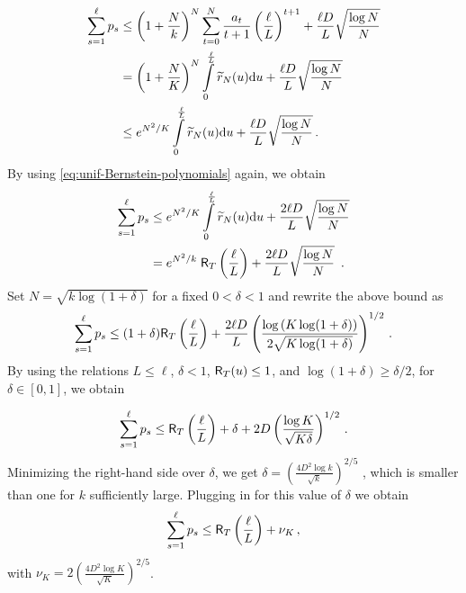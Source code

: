 \documentclass[11pt]{article}
\begin{document}
\begin{align*}
	\sum\limits_{s=1}^{\ell}p_s &\leq\left(1+\frac{N}{k}\right)^N \sum\limits_{t=0}^{N} \frac{a_t}{t+1}\left(\frac{\ell}{L}\right)^{t+1}+ \frac{\ell D}{L}\sqrt{\frac{\log{N}}{N}}\\
	&=\left(1+\frac{N}{K}\right)^N\int\limits_{0}^{\frac{\ell}{L}}\widetilde{r}_N(u){\rm d} u+ \frac{\ell D}{L}\sqrt{\frac{\log{N}}{N}}\\
	&\leq e^{N^2/K}\int\limits_{0}^{\frac{\ell}{L}}\widetilde{r}_N(u){\rm d} u+ \frac{\ell D}{L}\sqrt{\frac{\log{N}}{N}}\,.
	\end{align*}
By using \eqref{eq:unif-Bernstein-polynomials} again, we obtain 
%
\begin{align*}
	\sum\limits_{s=1}^{\ell}p_s&\leq e^{N^2/K}\int\limits_{0}^{\frac{\ell}{L}}\widetilde{r}_N(u){\rm d} u+ \frac{2\ell D}{L}\sqrt{\frac{\log{N}}{N}}\\
	&=e^{N^2/k}\;\mathsf{R}_{T}\left(\frac{\ell}{L} \right)+ \frac{2\ell D}{L}\sqrt{\frac{\log{N}}{N}}\ \,.
\end{align*}
Set $N=\sqrt{k\log(1+\delta) }$ for a fixed $0<\delta<1$ and rewrite the above bound as
\[	\sum\limits_{s=1}^{\ell}p_s \leq
(1+\delta)\mathsf{R}_{T}\left(\frac{\ell}{L} \right)+ \frac{2\ell D}{L}\left( \frac{\log\left(K\log(1+\delta)\right)}{2\sqrt{K\log(1+\delta)}}\right)^{1/2}\,.
\]
By using the relations  $L\leq\ell$, $\delta<1$, $\mathsf{R}_T(u)\leq 1$, and $\log(1+\delta)\geq\delta/2$, for $\delta\in[0,1]$, we obtain

\[	\sum\limits_{s=1}^{\ell}p_s \leq
\mathsf{R}_{T}\left(\frac{\ell}{L} \right)+ \delta +2D\left( \frac{\log{K}}{\sqrt{K\delta}}\right)^{1/2}\,.
\]
Minimizing the right-hand side over $\delta$, we get $\delta = \left(\frac{4D^2\log{k}}{\sqrt{k}}  \right)^{2/5}$ , which is smaller than one for $k$ sufficiently large. Plugging in for this value of $\delta$ we obtain 
\[
\sum\limits_{s=1}^{\ell}p_s \leq \mathsf{R}_{T}\left(\frac{\ell}{L} \right)+\nu_K\,,
\]
with $\nu_K=2\left(\frac{4D^2\log{K}}{\sqrt{K}}  \right)^{2/5}$.
\end{document}
